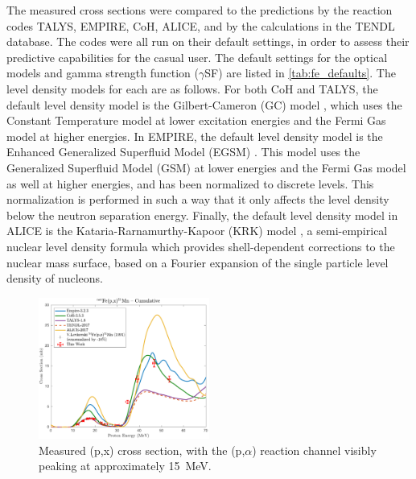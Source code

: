 The measured cross sections were compared to the predictions by the reaction codes TALYS, EMPIRE, CoH, ALICE, and by the calculations in the TENDL database.
The codes were all run on their default settings, in order to assess their predictive capabilities for the casual user.
The default settings for the optical models and gamma strength function ($\gamma$SF) are listed in  \autoref{tab:fe_defaults}.
The level density models for each are as follows.
For both CoH and TALYS, the default level density model is the Gilbert-Cameron (GC) model \cite{Gilbert2011}, which uses the Constant Temperature model at lower excitation energies and the Fermi Gas model at higher energies.
In EMPIRE, the default level density model is the Enhanced Generalized Superfluid Model (EGSM) \cite{Giardina2002}.
This model uses the Generalized Superfluid Model (GSM) \cite{ignatyuk1979role,Ignatyuk1993} at lower energies and the Fermi Gas model as well at higher energies, and has been normalized to discrete levels.
This normalization is performed in such a way that it only affects the level density below the neutron separation energy.
Finally, the default level density model in ALICE is the Kataria-Rarnamurthy-Kapoor (KRK) model \cite{Kataria1978,Kataria1990}, a semi-empirical nuclear level density formula which provides shell-dependent corrections to the nuclear mass surface, based on a Fourier expansion of the single particle level density of nucleons.



\begin{figure}[h]
 \centering
 \includegraphics[width=0.5\textwidth]{./figures/51Mn.pdf}
 \caption{Measured (p,x) cross section, with the (p,$\alpha$) reaction channel visibly peaking at approximately \mbox{15 MeV}.}
 \label{fig:51Mn}
\end{figure}





